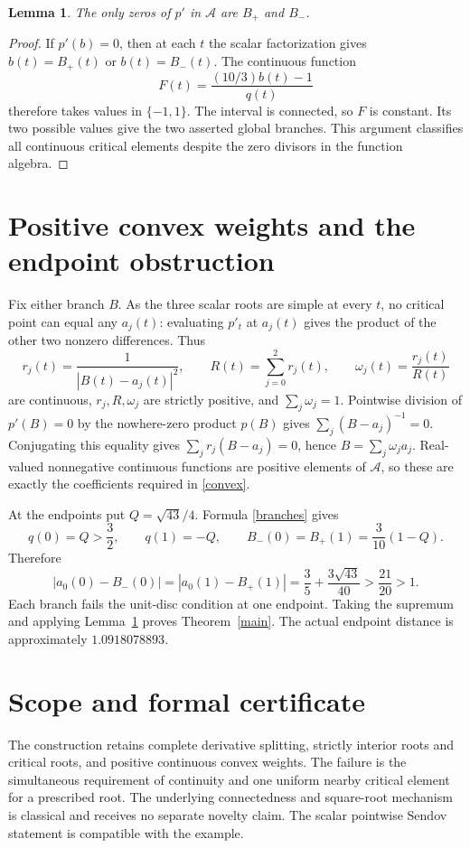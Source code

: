 \documentclass[11pt]{article}
\newtheorem{lemma}{Lemma}
\newcommand{\A}{\mathcal A}
\begin{document}
\begin{lemma}\label{allcritical}
The only zeros of $p'$ in $\A$ are $B_+$ and $B_-$.
\end{lemma}
\begin{proof}
If $p'(b)=0$, then at each $t$ the scalar factorization gives
$b(t)=B_+(t)$ or $b(t)=B_-(t)$. The continuous function
\[
 F(t)=\frac{(10/3)b(t)-1}{q(t)}
\]
therefore takes values in $\{-1,1\}$. The interval is connected, so $F$
is constant. Its two possible values give the two asserted global branches.
This argument classifies all continuous critical elements despite the zero
divisors in the function algebra.
\end{proof}

\section{Positive convex weights and the endpoint obstruction}
Fix either branch $B$. As the three scalar roots are simple at every $t$,
no critical point can equal any $a_j(t)$: evaluating $p'_t$ at $a_j(t)$
gives the product of the other two nonzero differences. Thus
\[
 r_j(t)=\frac1{|B(t)-a_j(t)|^2},\qquad
 R(t)=\sum_{j=0}^2r_j(t),\qquad
 \omega_j(t)=\frac{r_j(t)}{R(t)}
\]
are continuous, $r_j,R,\omega_j$ are strictly positive, and $\sum_j\omega_j=1$.
Pointwise division of $p'(B)=0$ by the nowhere-zero product $p(B)$ gives
$\sum_j(B-a_j)^{-1}=0$. Conjugating this equality gives
$\sum_j r_j(B-a_j)=0$, hence $B=\sum_j\omega_j a_j$.
Real-valued nonnegative continuous functions are positive elements of $\A$,
so these are exactly the coefficients required in \eqref{convex}.

At the endpoints put $Q=\sqrt{43}/4$. Formula \eqref{branches} gives
\[
 q(0)=Q>\frac32,\qquad q(1)=-Q,\qquad
 B_-(0)=B_+(1)=\frac3{10}(1-Q).
\]
Therefore
\begin{equation}\label{gap}
 |a_0(0)-B_-(0)|=|a_0(1)-B_+(1)|
 =\frac35+\frac{3\sqrt{43}}{40}>\frac{21}{20}>1.
\end{equation}
Each branch fails the unit-disc condition at one endpoint. Taking the
supremum and applying Lemma~\ref{allcritical} proves Theorem~\ref{main}.
The actual endpoint distance is approximately $1.0918078893$.

\clearpage
\section{Scope and formal certificate}
The construction retains complete derivative splitting, strictly interior
roots and critical roots, and positive continuous convex weights. The
failure is the simultaneous requirement of continuity and one uniform
nearby critical element for a prescribed root. The underlying connectedness
and square-root mechanism is classical and receives no separate novelty
claim. The scalar pointwise Sendov statement is compatible with the example.
\end{document}
